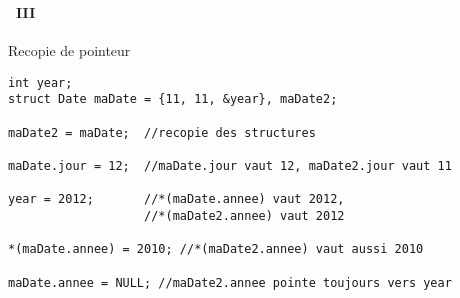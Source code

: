 \begin{frame}[containsverbatim]
  \frametitle{\secname}
  \framesubtitle{\subsecname~III}

  {\small\begin{exampleblock}{Recopie de pointeur}
    \begin{verbatim}
int year;
struct Date maDate = {11, 11, &year}, maDate2;

maDate2 = maDate;  //recopie des structures

maDate.jour = 12;  //maDate.jour vaut 12, maDate2.jour vaut 11

year = 2012;       //*(maDate.annee) vaut 2012, 
                   //*(maDate2.annee) vaut 2012

*(maDate.annee) = 2010; //*(maDate2.annee) vaut aussi 2010

maDate.annee = NULL; //maDate2.annee pointe toujours vers year\end{verbatim}
  \end{exampleblock}}
\end{frame}


